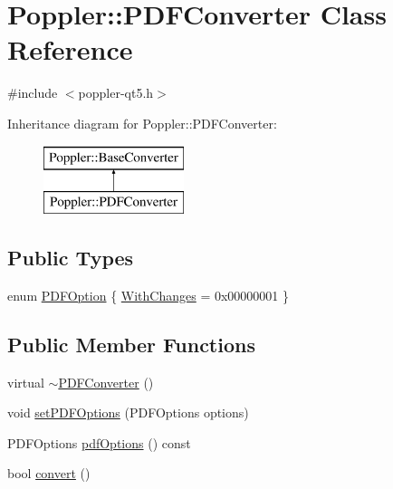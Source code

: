 \hypertarget{class_poppler_1_1_p_d_f_converter}{}\section{Poppler\+:\+:P\+D\+F\+Converter Class Reference}
\label{class_poppler_1_1_p_d_f_converter}


{\ttfamily \#include $<$poppler-\/qt5.\+h$>$}

Inheritance diagram for Poppler\+:\+:P\+D\+F\+Converter\+:\begin{figure}[H]
\begin{center}
\leavevmode
\includegraphics[height=2.000000cm]{class_poppler_1_1_p_d_f_converter}
\end{center}
\end{figure}
\subsection*{Public Types}
\begin{DoxyCompactItemize}
\item 
enum \hyperlink{class_poppler_1_1_p_d_f_converter_a16b3fa4a594bdb7bfa09aaf40ed37f16}{P\+D\+F\+Option} \{ \hyperlink{class_poppler_1_1_p_d_f_converter_a16b3fa4a594bdb7bfa09aaf40ed37f16aefcb951a59ff05315133fb13af85d51b}{With\+Changes} = 0x00000001
 \}
\end{DoxyCompactItemize}
\subsection*{Public Member Functions}
\begin{DoxyCompactItemize}
\item 
virtual \hyperlink{class_poppler_1_1_p_d_f_converter_a270aae35fe466a674be22e89c9777a7b}{$\sim$\+P\+D\+F\+Converter} ()
\item 
void \hyperlink{class_poppler_1_1_p_d_f_converter_a2d374a0ea57cc34139d816f1fe51d8a1}{set\+P\+D\+F\+Options} (P\+D\+F\+Options options)
\item 
P\+D\+F\+Options \hyperlink{class_poppler_1_1_p_d_f_converter_a11f0737be998533071c682d0d69cc736}{pdf\+Options} () const
\item 
bool \hyperlink{class_poppler_1_1_p_d_f_converter_a35f0de4e846e850c489b7f1b265908b5}{convert} ()
\end{DoxyCompactItemize}

